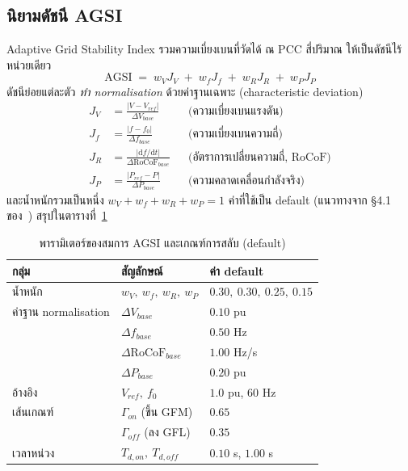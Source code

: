 \documentclass[12pt,a4paper]{article}
\begin{document}
\subsection{นิยามดัชนี AGSI}
Adaptive Grid Stability Index รวมความเบี่ยงเบนที่วัดได้ ณ PCC สี่ปริมาณ ให้เป็นดัชนีไร้หน่วยเดียว
\begin{equation}
\boxed{\;\mathrm{AGSI} \;=\; w_V J_V \;+\; w_f J_f \;+\; w_R J_R \;+\; w_P J_P\;}
\label{eq:agsi}
\end{equation}
ดัชนีย่อยแต่ละตัว \emph{ทำ normalisation} ด้วยค่าฐานเฉพาะ (characteristic deviation)
\begin{align}
J_V &= \frac{\lvert V - V_{ref}\rvert}{\Delta V_{base}}
   &&\text{(ความเบี่ยงเบนแรงดัน)}\label{eq:jv}\\
J_f &= \frac{\lvert f - f_0\rvert}{\Delta f_{base}}
   &&\text{(ความเบี่ยงเบนความถี่)}\label{eq:jf}\\
J_R &= \frac{\lvert \mathrm{d}f/\mathrm{d}t\rvert}{\Delta \mathrm{RoCoF}_{base}}
   &&\text{(อัตราการเปลี่ยนความถี่, RoCoF)}\label{eq:jr}\\
J_P &= \frac{\lvert P_{ref} - P\rvert}{\Delta P_{base}}
   &&\text{(ความคลาดเคลื่อนกำลังจริง)}\label{eq:jp}
\end{align}
และน้ำหนักรวมเป็นหนึ่ง $w_V + w_f + w_R + w_P = 1$ ค่าที่ใช้เป็น default (แนวทางจาก \S4.1
ของ~\cite{eecon49th}) สรุปในตารางที่~\ref{tab:agsi}

\begin{table}[H]\centering
\caption{พารามิเตอร์ของสมการ AGSI และเกณฑ์การสลับ (default)}
\label{tab:agsi}
\begin{tabular}{@{}lll@{}}
\toprule
กลุ่ม & สัญลักษณ์ & ค่า default \\
\midrule
น้ำหนัก & $w_V,\ w_f,\ w_R,\ w_P$ & $0.30,\ 0.30,\ 0.25,\ 0.15$ \\
ค่าฐาน normalisation & $\Delta V_{base}$ & $0.10$ pu \\
 & $\Delta f_{base}$ & $0.50$ Hz \\
 & $\Delta \mathrm{RoCoF}_{base}$ & $1.00$ Hz/s \\
 & $\Delta P_{base}$ & $0.20$ pu \\
อ้างอิง & $V_{ref},\ f_0$ & $1.0$ pu, $60$ Hz \\
เส้นเกณฑ์ & $\Gamma_{on}$ (ขึ้น GFM) & $0.65$ \\
 & $\Gamma_{off}$ (ลง GFL) & $0.35$ \\
เวลาหน่วง & $T_{d,on},\ T_{d,off}$ & $0.10$ s, $1.00$ s \\
\bottomrule
\end{tabular}
\end{table}
\end{document}
